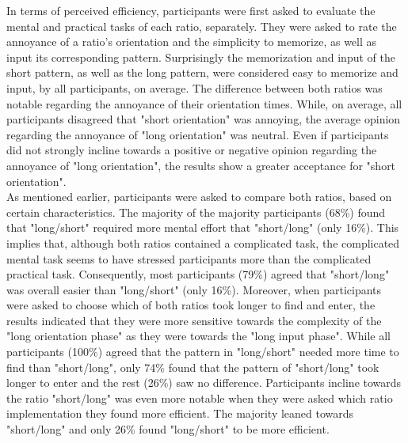 In terms of perceived efficiency, participants were first asked to evaluate the mental and practical tasks of each ratio, separately. They were asked to rate the annoyance of a ratio's orientation and the simplicity to memorize, as well as input its corresponding pattern. Surprisingly the memorization and input of the short pattern, as well as the long pattern, were considered easy to memorize and input, by all participants, on average. The difference between both ratios was notable regarding the annoyance of their orientation times. While, on average, all participants disagreed that "short orientation" was annoying, the average opinion regarding the annoyance of "long orientation" was neutral. Even if participants did not strongly incline towards a positive or negative opinion regarding the annoyance of "long orientation", the results show a greater acceptance for "short orientation".\\

As mentioned earlier, participants were asked to compare both ratios, based on certain characteristics. The majority of the majority participants (68\%) found that "long/short" required more mental effort that "short/long" (only 16\%). This implies that, although both ratios contained a complicated task, the complicated mental task seems to have stressed participants more than the complicated practical task. Consequently, most participants (79\%) agreed that "short/long" was overall easier than "long/short" (only 16\%). Moreover, when participants were asked to choose which of both ratios took longer to find and enter, the results indicated that they were more sensitive towards the complexity of the "long orientation phase" as they were towards the "long input phase". While all participants (100\%) agreed that the pattern in "long/short" needed more time to find than "short/long", only 74\% found that the pattern of "short/long" took longer to enter and the rest (26\%) saw no difference. Participants incline towards the ratio "short/long" was even more notable when they were asked which ratio implementation they found more efficient. The majority leaned towards "short/long" and only 26\% found "long/short" to be more efficient. \\

